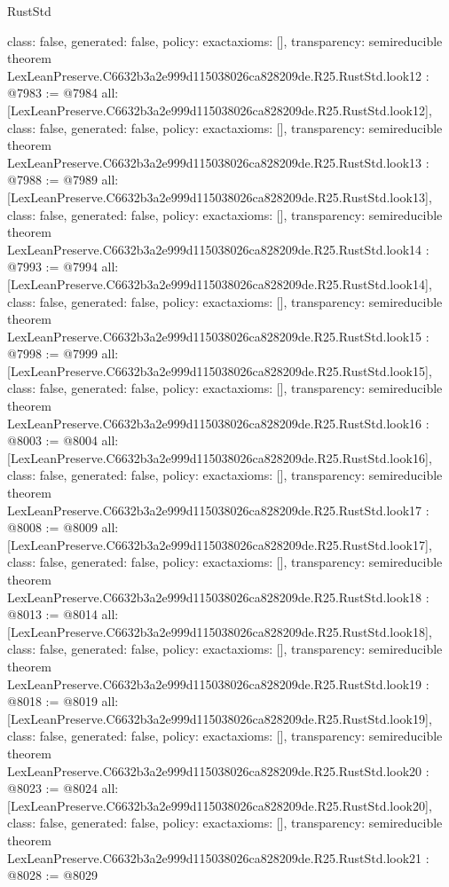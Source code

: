 \begin{lexlean}{RustStd}
\begin{coremodule}
{  class: false,
  generated: false,
  policy: exact{axioms: []},
  transparency: semireducible
}
theorem LexLeanPreserve.C6632b3a2e999d115038026ca828209de.R25.RustStd.look12 : @7983 := @7984 {
  all: [LexLeanPreserve.C6632b3a2e999d115038026ca828209de.R25.RustStd.look12],
  class: false,
  generated: false,
  policy: exact{axioms: []},
  transparency: semireducible
}
theorem LexLeanPreserve.C6632b3a2e999d115038026ca828209de.R25.RustStd.look13 : @7988 := @7989 {
  all: [LexLeanPreserve.C6632b3a2e999d115038026ca828209de.R25.RustStd.look13],
  class: false,
  generated: false,
  policy: exact{axioms: []},
  transparency: semireducible
}
theorem LexLeanPreserve.C6632b3a2e999d115038026ca828209de.R25.RustStd.look14 : @7993 := @7994 {
  all: [LexLeanPreserve.C6632b3a2e999d115038026ca828209de.R25.RustStd.look14],
  class: false,
  generated: false,
  policy: exact{axioms: []},
  transparency: semireducible
}
theorem LexLeanPreserve.C6632b3a2e999d115038026ca828209de.R25.RustStd.look15 : @7998 := @7999 {
  all: [LexLeanPreserve.C6632b3a2e999d115038026ca828209de.R25.RustStd.look15],
  class: false,
  generated: false,
  policy: exact{axioms: []},
  transparency: semireducible
}
theorem LexLeanPreserve.C6632b3a2e999d115038026ca828209de.R25.RustStd.look16 : @8003 := @8004 {
  all: [LexLeanPreserve.C6632b3a2e999d115038026ca828209de.R25.RustStd.look16],
  class: false,
  generated: false,
  policy: exact{axioms: []},
  transparency: semireducible
}
theorem LexLeanPreserve.C6632b3a2e999d115038026ca828209de.R25.RustStd.look17 : @8008 := @8009 {
  all: [LexLeanPreserve.C6632b3a2e999d115038026ca828209de.R25.RustStd.look17],
  class: false,
  generated: false,
  policy: exact{axioms: []},
  transparency: semireducible
}
theorem LexLeanPreserve.C6632b3a2e999d115038026ca828209de.R25.RustStd.look18 : @8013 := @8014 {
  all: [LexLeanPreserve.C6632b3a2e999d115038026ca828209de.R25.RustStd.look18],
  class: false,
  generated: false,
  policy: exact{axioms: []},
  transparency: semireducible
}
theorem LexLeanPreserve.C6632b3a2e999d115038026ca828209de.R25.RustStd.look19 : @8018 := @8019 {
  all: [LexLeanPreserve.C6632b3a2e999d115038026ca828209de.R25.RustStd.look19],
  class: false,
  generated: false,
  policy: exact{axioms: []},
  transparency: semireducible
}
theorem LexLeanPreserve.C6632b3a2e999d115038026ca828209de.R25.RustStd.look20 : @8023 := @8024 {
  all: [LexLeanPreserve.C6632b3a2e999d115038026ca828209de.R25.RustStd.look20],
  class: false,
  generated: false,
  policy: exact{axioms: []},
  transparency: semireducible
}
theorem LexLeanPreserve.C6632b3a2e999d115038026ca828209de.R25.RustStd.look21 : @8028 := @8029 {
}
\end{coremodule}
\end{lexlean}
